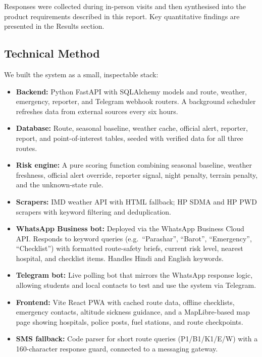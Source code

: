 \documentclass[12pt,a4paper]{article}
\begin{document}
Responses were collected during in-person visits and then synthesised into the product requirements described in this report. Key quantitative findings are presented in the Results section.

\subsection{Technical Method}

We built the system as a small, inspectable stack:

\begin{itemize}
  \item \textbf{Backend:} Python FastAPI with SQLAlchemy models and route, weather, emergency, reporter, and Telegram webhook routers. A background scheduler refreshes data from external sources every six hours.
  \item \textbf{Database:} Route, seasonal baseline, weather cache, official alert, reporter, report, and point-of-interest tables, seeded with verified data for all three routes.
  \item \textbf{Risk engine:} A pure scoring function combining seasonal baseline, weather freshness, official alert override, reporter signal, night penalty, terrain penalty, and the unknown-state rule.
  \item \textbf{Scrapers:} IMD weather API with HTML fallback; HP SDMA and HP PWD scrapers with keyword filtering and deduplication.
  \item \textbf{WhatsApp Business bot:} Deployed via the WhatsApp Business Cloud API. Responds to keyword queries (e.g.\ ``Parashar'', ``Barot'', ``Emergency'', ``Checklist'') with formatted route-safety briefs, current risk level, nearest hospital, and checklist items. Handles Hindi and English keywords.
  \item \textbf{Telegram bot:} Live polling bot that mirrors the WhatsApp response logic, allowing students and local contacts to test and use the system via Telegram.
  \item \textbf{Frontend:} Vite React PWA with cached route data, offline checklists, emergency contacts, altitude sickness guidance, and a MapLibre-based map page showing hospitals, police posts, fuel stations, and route checkpoints.
  \item \textbf{SMS fallback:} Code parser for short route queries (P1/B1/K1/E/W) with a 160-character response guard, connected to a messaging gateway.
\end{itemize}
\end{document}
